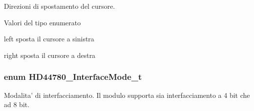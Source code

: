 Direzioni di spostamento del cursore. 

\begin{Desc}
\item[Valori del tipo enumerato]\par
\begin{description}
\item[{\em 
\hypertarget{group___h_d44780_ggaf46f4db4f981d3a1088804a6d6980d30aa4d704398d4edd1e0dec8dbb55f90292}{H\+D44780\+\_\+\+Cursor\+Left}\label{group___h_d44780_ggaf46f4db4f981d3a1088804a6d6980d30aa4d704398d4edd1e0dec8dbb55f90292}
}]left sposta il cursore a sinistra \item[{\em 
\hypertarget{group___h_d44780_ggaf46f4db4f981d3a1088804a6d6980d30a26006ced693b6bab28c6e30bfdb8c399}{H\+D44780\+\_\+\+Cursor\+Right}\label{group___h_d44780_ggaf46f4db4f981d3a1088804a6d6980d30a26006ced693b6bab28c6e30bfdb8c399}
}]right sposta il cursore a destra \end{description}
\end{Desc}
\hypertarget{group___h_d44780_gaaaea8b73e24f7658da4118f6b01b45f0}{
\subsubsection[{H\+D44780\+\_\+\+Interface\+Mode\+\_\+t}]{\setlength{\rightskip}{0pt plus 5cm}enum {\bf H\+D44780\+\_\+\+Interface\+Mode\+\_\+t}}}\label{group___h_d44780_gaaaea8b73e24f7658da4118f6b01b45f0}


Modalita' di interfacciamento. Il modulo supporta sia interfacciamento a 4 bit che ad 8 bit. 

